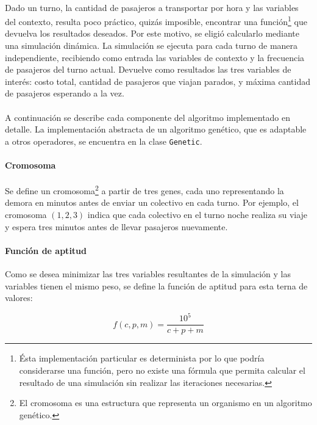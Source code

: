 \documentclass{conaiisi}
\begin{document}
\begin{multicols}{2}
\paragraph{}
Dado un turno, la cantidad de pasajeros a transportar por hora y las variables del contexto, resulta poco práctico, quizás imposible, encontrar una función\footnote{Ésta implementación particular es determinista por lo que podría considerarse una función, pero no existe una fórmula que permita calcular el resultado de una simulación sin realizar las iteraciones necesarias.} que devuelva los resultados deseados.
Por este motivo, se eligió calcularlo mediante una simulación dinámica.
La simulación se ejecuta para cada turno de manera independiente, recibiendo como entrada las variables de contexto y la frecuencia de pasajeros del turno actual.
Devuelve como resultados las tres variables de interés: costo total, cantidad de pasajeros que viajan parados, y máxima cantidad de pasajeros esperando a la vez.

\paragraph{}
A continuación se describe cada componente del algoritmo implementado en detalle.
La implementación abstracta de un algoritmo genético, que es adaptable a otros operadores, se encuentra en la clase \texttt{Genetic}.

\paragraph{Cromosoma}

Se define un cromosoma\footnote{El cromosoma es una estructura que representa un organismo en un algoritmo genético.} a partir de tres genes, cada uno representando la demora en minutos antes de enviar un colectivo en cada turno.
Por ejemplo, el cromosoma $(1,2,3)$ indica que cada colectivo en el turno noche realiza su viaje y espera tres minutos antes de llevar pasajeros nuevamente.

\paragraph{Función de aptitud}

Como se desea minimizar las tres variables resultantes de la simulación y las variables tienen el mismo peso, se define la función de aptitud para esta terna de valores:

\[ f(c, p, m) = \frac{10^5}{c + p + m} \]


\end{multicols}
\end{document}

